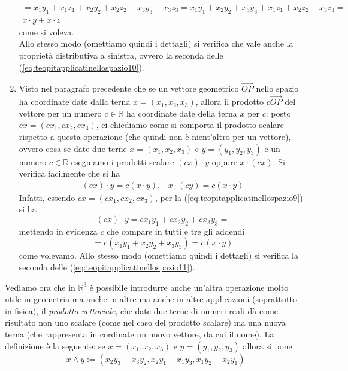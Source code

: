 \documentclass{book}
\theoremstyle{definition}
\theoremstyle{plain}
\begin{document}
\begin{enumerate}
\begin{equation*}
\begin{matrix}
      =x_1y_1+x_1z_1+x_2y_2+x_2z_2+x_3y_3+x_3z_3=x_1y_1+x_2y_2+x_3y_3+x_1z_1+x_2z_2+x_3z_3=\\
      x\cdot y+x\cdot z
    \end{matrix}
  \end{equation*}
  come si voleva.\\
  Allo stesso modo (omettiamo quindi i dettagli) si verifica che vale anche la proprietà distributiva a sinistra, ovvero la seconda delle (\ref{eq:teopitapplicatinellospazio10}).
\item Visto nel paragrafo precedente che se un vettore geometrico $\vec{OP}$ nello spazio ha coordinate date dalla terna $x=(x_1,x_2,x_3)$, allora il prodotto $c\vec{OP}$ del vettore per un numero $c\in \mathds{R}$ ha coordinate date della terna $x$ per $c$: posto $cx=(cx_1,cx_2,cx_3)$, ci chiediamo come si comporta il prodotto scalare rispetto a questa operazione (che quindi non è nient'altro per un vettore), ovvero cosa se date due terne $x=(x_1,x_2,x_3)$ e $y=(y_1,y_2,y_3)$ e un numero $c\in \mathds{R}$ eseguiamo i prodotti scalare $(cx)\cdot y$ oppure $x\cdot (cx)$. Si verifica facilmente che si ha
  \begin{eqnarray}
    \label{eq:teopitapplicatinellospazio11}
    (cx)\cdot y=c(x\cdot y), & x\cdot (cy)=c(x\cdot y)
  \end{eqnarray}
  Infatti, essendo $cx=(cx_1,cx_2,cx_3)$, per la (\ref{eq:teopitapplicatinellospazio9}) si ha
  \begin{equation*}
    (cx)\cdot y=cx_1y_1+cx_2y_2+cx_3y_3=
  \end{equation*}
  mettendo in evidenza $c$ che compare in tutti e tre gli addendi
  \begin{equation*}
    =c(x_1y_1+x_2y_2+x_3y_3)=c(x\cdot y)
  \end{equation*}
  come volevamo. Allo stesso modo (omettiamo quindi i dettagli) si verifica la seconda delle (\ref{eq:teopitapplicatinellospazio11}).
\end{enumerate}
Vediamo ora che in $\mathds{R}^3$ è possibile introdurre anche un'altra operazione molto utile in geometria ma anche in altre ma anche in altre applicazioni (soprattutto in fisica), il \textit{prodotto vettoriale}, che date due terne di numeri reali dà come risultato non uno scalare (come nel caso del prodotto scalare) ma una nuova terna (che rappresenta in cordinate un nuovo vettore, da cui il nome). La definizione è la seguente: se $x=(x_1,x_2,x_3)$ e $y=(y_1,y_2,y_3)$ allora si pone
\begin{equation}
  \label{eq:teopitapplicatinellospazio12}
  x\wedge y := (x_2y_3-x_3y_2,x_2y_1-x_1y_3,x_1y_2-x_2y_1)
\end{equation}
\end{document}

